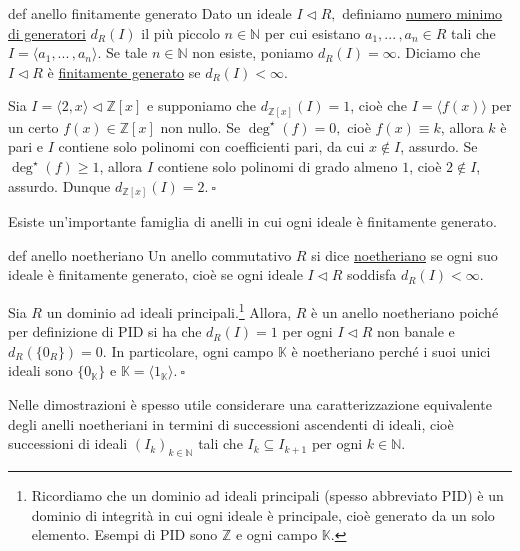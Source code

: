 \vspace{-2mm}

\begin{defn}[]{def anello finitamente generato}
  Dato un ideale $I\lhd R,$ definiamo \underline{numero minimo di generatori} $d_R(I)$ il più piccolo $n\in \mathbb{N}$ 
  per cui esistano $a_1,...\,,a_n\in R$ tali che $I=\langle a_1,...\,,a_n\rangle.$ Se tale $n\in \mathbb{N}$ non esiste, 
  poniamo $d_R(I)=\infty.$ Diciamo che $I\lhd R$ è \underline{finitamente generato} se $d_R(I)<\infty.$
\end{defn}

\begin{exm} 
  Sia $I=\langle 2, x\rangle \lhd \mathbb{Z}[x]$ e supponiamo che $d_{\mathbb{Z}[x]}(I)=1$, 
  cioè che $I=\langle f(x)\rangle$ per un certo $f(x)\in \mathbb{Z}[x]$ non nullo. 
  Se $\deg^{\star}(f)=0,$ cioè $f(x)\equiv k$, allora $k$ è pari e $I$ contiene solo polinomi con coefficienti pari, 
  da cui $x\not\in I$, assurdo. Se $\deg^{\star}(f)\geq 1$, allora $I$ contiene solo polinomi di grado almeno $1$, 
  cioè $2\not\in I$, assurdo. Dunque $d_{\mathbb{Z}[x]}(I)=2. \ \square$
\end{exm}

\noindent Esiste un'importante famiglia di anelli in cui ogni ideale è finitamente generato.

\begin{defn}{def anello noetheriano}
  Un anello commutativo $R$ si dice \underline{noetheriano} se ogni suo ideale è finitamente generato, 
  cioè se ogni ideale $I\lhd R$ soddisfa $d_R(I)<\infty.$
\end{defn}

\begin{exm}Sia $R$ un dominio ad ideali principali.\footnote{Ricordiamo che un dominio ad ideali principali (spesso abbreviato PID) è un dominio di integrità in cui ogni ideale è principale, cioè generato da un solo elemento. Esempi di PID sono $\mathbb{Z}$ e ogni campo $\mathbb{K}.$} Allora, $R$ è un anello noetheriano poiché per definizione di PID si ha che $d_R(I)=1$ per ogni $I\lhd R$ non banale e $d_R(\{0_R\})=0.$ In particolare, ogni campo $\mathbb{K}$ è noetheriano perché i suoi unici ideali sono $\{0_{\mathbb{K}}\}$ e $\mathbb{K}=\langle 1_{\mathbb{K}}\rangle. \ \square$\end{exm}

\noindent Nelle dimostrazioni è spesso utile considerare una caratterizzazione equivalente degli anelli noetheriani in termini di successioni ascendenti di ideali, cioè successioni di ideali $(I_k)_{k\in \mathbb{N}}$ tali che $I_k\subseteq I_{k+1}$ per ogni $k\in \mathbb{N}$.

